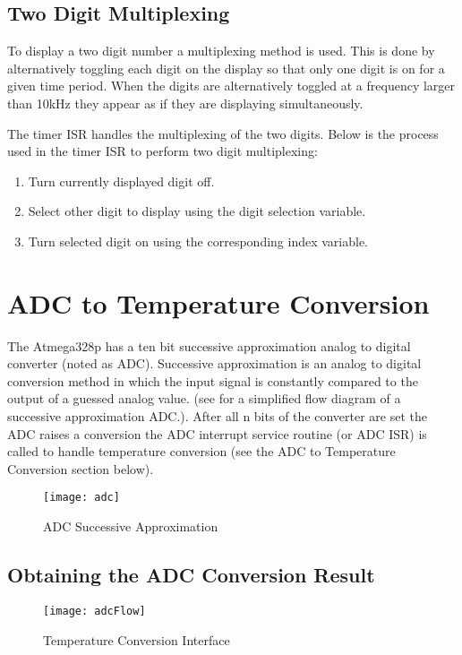 \documentclass[main.tex]{subfiles}
\begin{document}
		\subsection{Two Digit Multiplexing}
		To display a two digit number a multiplexing method is used. This is done by
		alternatively toggling each digit on the display so that only one digit is
		on for a given time period. When the digits are alternatively toggled at a
		frequency larger than 10kHz they appear as if they are displaying
		simultaneously. 

		The timer ISR handles the multiplexing of the two digits. Below is the
		process used in the timer ISR to perform two digit multiplexing: 

		\begin{enumerate}
			\item Turn currently displayed digit off.
			\item Select other digit to display using the digit selection variable.
			\item Turn selected digit on using the corresponding index variable.
		\end{enumerate}

	\section{ADC to Temperature Conversion}
	The Atmega328p has a ten bit successive approximation analog to digital
	converter (noted as ADC). Successive approximation is an analog to digital
	conversion method in which the input signal is constantly compared to the
	output of a guessed analog value. (see  for a simplified flow
	diagram of a successive approximation ADC.). After all n bits of the converter
	are set the ADC raises a conversion the ADC interrupt service routine (or ADC
	ISR) is called to handle temperature conversion (see the ADC to Temperature
	Conversion section below). 
	\begin{figure}[H]
		\begin{center}
			\texttt{[image: adc]}
		\end{center}
		\caption{ADC Successive Approximation}
		\label{fig:adcSA}
	\end{figure}
	
		\subsection{Obtaining the ADC Conversion Result}
		\begin{figure}[H]
			\begin{center}
				\texttt{[image: adcFlow]}
			\end{center}
			\caption{Temperature Conversion Interface}
			\label{fig:tempConvIfc}
		\end{figure}
\end{document}
